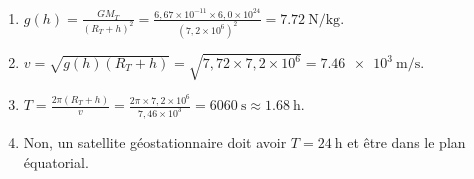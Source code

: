 \begin{enumerate}[label=\arabic*)]
\item $g(h) = \frac{GM_T}{(R_T+h)^2} = \frac{6,67\times10^{-11}\times6,0\times10^{24}}{(7,2\times10^{6})^2} = \SI{7.72}{\newton\per\kilogram}$.
\item $v = \sqrt{g(h)(R_T+h)} = \sqrt{7,72\times7,2\times10^{6}} = \SI{7.46e3}{\metre\per\second}$.
\item $T = \frac{2\pi(R_T+h)}{v} = \frac{2\pi\times7,2\times10^{6}}{7,46\times10^{3}} = \SI{6060}{\second} \approx \SI{1.68}{\hour}$.
\item Non, un satellite géostationnaire doit avoir $T = \SI{24}{\hour}$ et être dans le plan équatorial.
\end{enumerate}

\endinput